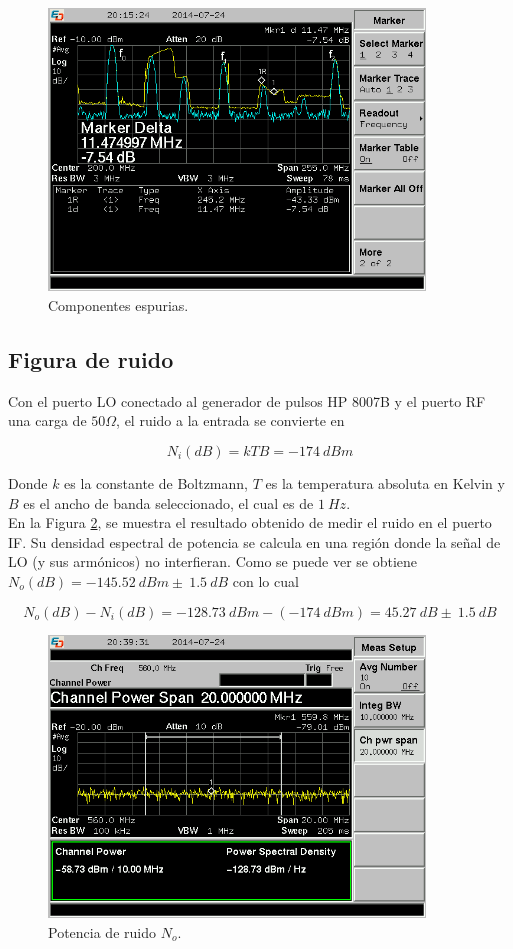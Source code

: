 \documentclass[a4paper,10pt]{article}
\begin{document}
	\begin{figure}[!htb]
		\centering
		\includegraphics[width=10cm]{Images/SCREN539.png}
		\caption{Componentes espurias.}
		\label{espurios}
	\end{figure}
		
	\subsection{Figura de ruido}
	\indent Con el puerto LO conectado al generador de pulsos HP 8007B y el 
	puerto RF una carga de $50\Omega$, el ruido a la entrada se convierte en 

	$$N_i(dB)=kTB=-174~dBm$$
		
	Donde $k$ es la constante de Boltzmann, $T$ es la temperatura absoluta en 
	Kelvin y $B$ es el ancho de banda seleccionado, el cual es de $1~Hz$. \\
	\indent En la Figura \ref{noise}, se muestra el resultado obtenido de medir 
	el ruido en el puerto IF. Su densidad espectral de potencia se calcula en 
	una regi\'on donde la se\~nal de LO (y sus arm\'onicos) no interfieran. Como
	se puede ver se obtiene $N_o(dB)=-145.52~dBm\pm~1.5~dB$ con lo cual
		
	$$N_o(dB)-N_i(dB)=-128.73~dBm-(-174~dBm)=45.27~dB\pm~1.5~dB$$			
	
	\begin{figure}[!htb]
		\centering
		\includegraphics[width=10cm]{Images/SCREN542.png}
		\caption{Potencia de ruido $N_o$.}
		\label{noise}
	\end{figure}
	
\end{document}
